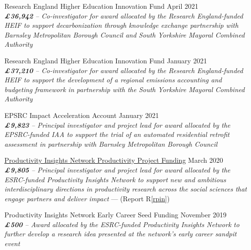 \documentclass[10pt]{article}
\newcommand{\blankline}{\quad\pagebreak[3]}
\begin{document}
\blankline

Research England Higher Education Innovation Fund \hfill {April 2021}\\
\emph{\textbf{\pounds36,942} -- Co-investigator for award allocated by the Research England-funded HEIF to support decarbonization through knowledge exchange partnership with Barnsley Metropolitan Borough Council and South Yorkshire Mayoral Combined Authority}

\blankline

Research England Higher Education Innovation Fund \hfill {January 2021}\\
\emph{\textbf{\pounds37,210} -- Co-investigator for award allocated by the Research England-funded HEIF to support the development of a regional emissions accounting and budgeting framework in partnership with the South Yorkshire Mayoral Combined Authority}

\blankline

EPSRC Impact Acceleration Account \hfill {January 2021}\\
\emph{\textbf{\pounds9,823} -- Principal investigator and project lead for award allocated by the EPSRC-funded IAA to support the trial of an automated residential retrofit assessment in partnership with Barnsley Metropolitan Borough Council}

\blankline

\href{https://productivityinsightsnetwork.co.uk/projects/}{Productivity Insights Network Productivity Project Funding} \hfill {March 2020}\\
\emph{\textbf{\pounds9,805} -- Principal investigator and project lead for award allocated by the ESRC-funded Productivity Insights Network to support new and ambitious interdisciplinary directions in productivity research across the social sciences that engage partners and deliver impact} --- (Report R\ref{rpin})

\blankline

Productivity Insights Network Early Career Seed Funding \hfill {November 2019}\\
\emph{\textbf{\pounds500} -- Award allocated by the ESRC-funded Productivity Insights Network to further develop a research idea presented at the network's early career sandpit event}
\end{document}
